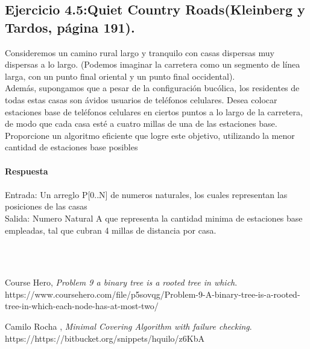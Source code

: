 \documentclass[a4paper,12pt]{article}
\begin{document}
\subsection{Ejercicio 4.5:Quiet Country Roads(Kleinberg y Tardos, página 191).}
Consideremos un camino rural largo y tranquilo con casas dispersas muy dispersas a lo largo. (Podemos imaginar la carretera como un segmento de línea larga, con un punto final oriental y un punto final occidental).\\
Además, supongamos que a pesar de la configuración bucólica, los residentes de todas estas casas son ávidos usuarios de teléfonos celulares. Desea colocar estaciones base de teléfonos celulares en ciertos puntos a lo largo de la carretera, de modo que cada casa esté a cuatro millas de una de las estaciones base.\\
Proporcione un algoritmo eficiente que logre este objetivo, utilizando la menor cantidad de estaciones base posibles\\\\
\textbf{Respuesta}\\\\
Entrada: Un arreglo P[0..N] de numeros naturales, los cuales representan las posiciones de las casas\\
Salida: Numero Natural A que representa la cantidad minima de estaciones base empleadas, tal que cubran 4 millas de distancia por casa.

\cite{CR}\\\\
\clearpage
\begin{thebibliography}{15}

  Course Hero,
  \emph{Problem 9 a binary tree is a rooted tree in which}.\\
  https://www.coursehero.com/file/p5sovqg/Problem-9-A-binary-tree-is-a-rooted-tree-in-which-each-node-has-at-most-two/

  Camilo Rocha ,
  \emph{Minimal Covering Algorithm with failure checking}.\\
  https://https://bitbucket.org/snippets/hquilo/z6KbA
  
\end{thebibliography}

\end{document}
